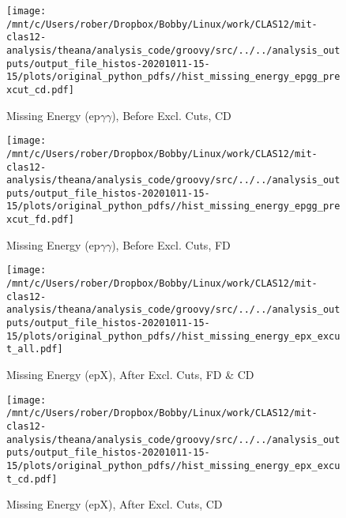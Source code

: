 \documentclass{article}
\begin{document}
\begin{landscape}
    \begin{figure}[h]
        \centering

        \texttt{[image: /mnt/c/Users/rober/Dropbox/Bobby/Linux/work/CLAS12/mit-clas12-analysis/theana/analysis\_code/groovy/src/../../analysis\_outputs/output\_file\_histos-20201011-15-15/plots/original\_python\_pdfs//hist\_missing\_energy\_epgg\_prexcut\_cd.pdf]}
        \captionsetup{textformat=empty,labelformat=blank}
        \caption{Missing Energy (ep$\gamma$$\gamma$), Before Excl. Cuts, CD}
    \end{figure}
    \clearpage
    
    \begin{figure}[h]
        \centering

        \texttt{[image: /mnt/c/Users/rober/Dropbox/Bobby/Linux/work/CLAS12/mit-clas12-analysis/theana/analysis\_code/groovy/src/../../analysis\_outputs/output\_file\_histos-20201011-15-15/plots/original\_python\_pdfs//hist\_missing\_energy\_epgg\_prexcut\_fd.pdf]}
        \captionsetup{textformat=empty,labelformat=blank}
        \caption{Missing Energy (ep$\gamma$$\gamma$), Before Excl. Cuts, FD}
    \end{figure}
    \clearpage
    
    \begin{figure}[h]
        \centering

        \texttt{[image: /mnt/c/Users/rober/Dropbox/Bobby/Linux/work/CLAS12/mit-clas12-analysis/theana/analysis\_code/groovy/src/../../analysis\_outputs/output\_file\_histos-20201011-15-15/plots/original\_python\_pdfs//hist\_missing\_energy\_epx\_excut\_all.pdf]}
        \captionsetup{textformat=empty,labelformat=blank}
        \caption{Missing Energy (epX), After Excl. Cuts, FD \& CD}
    \end{figure}
    \clearpage
    
    \begin{figure}[h]
        \centering

        \texttt{[image: /mnt/c/Users/rober/Dropbox/Bobby/Linux/work/CLAS12/mit-clas12-analysis/theana/analysis\_code/groovy/src/../../analysis\_outputs/output\_file\_histos-20201011-15-15/plots/original\_python\_pdfs//hist\_missing\_energy\_epx\_excut\_cd.pdf]}
        \captionsetup{textformat=empty,labelformat=blank}
        \caption{Missing Energy (epX), After Excl. Cuts, CD}
    \end{figure}
    \clearpage
    
    \begin{figure}[h]
        \centering


\end{figure}
\end{landscape}
\end{document}
